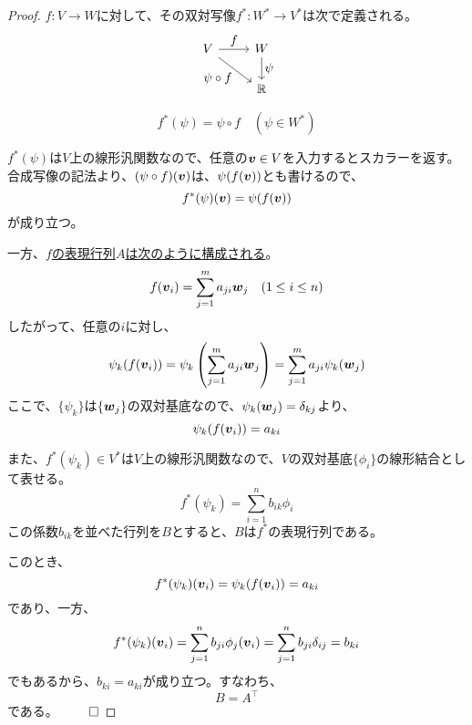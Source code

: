 \documentclass[../../../topic_linear-algebra]{subfiles}
\begin{document}
\begin{proof}
  $f\colon V \to W$に対して、その双対写像$f^* \colon W^* \to V^*$は次で定義される。
    \begin{equation*}
  \begin{tikzcd}[every label/.append style = {font = \normalsize}]
    V \arrow[r,"f"]\arrow[rd, "\psi \circ f"'] & W \arrow[d,"\psi"]\\
    & \mathbb{R}
  \end{tikzcd}
\end{equation*}
  
  \begin{equation*}
    f^*(\psi) = \psi \circ f \quad (\psi \in W^*)
  \end{equation*}
  
  $f^*(\psi)$は$V$上の線形汎関数なので、任意の$\vb*{v} \in V$を入力するとスカラーを返す。
  合成写像の記法より、$(\psi \circ f)(\vb*{v})$は、$\psi(f(\vb*{v}))$とも書けるので、
  \begin{equation*}
    f^*(\psi)(\vb*{v}) = \psi(f(\vb*{v}))
  \end{equation*}
  が成り立つ。
  
  \br

  一方、\hyperref[sec:construction-of-matrix-rep]{$f$の表現行列$A$は次のように構成される}。
  \begin{equation*}
    f(\vb*{v}_i) = \sum_{j=1}^m a_{ji} \vb*{w}_j \quad (1 \leq i \leq n)
  \end{equation*}
  したがって、任意の$i$に対し、
  \begin{equation*}
    \psi_k(f(\vb*{v}_i)) = \psi_k\left(\sum_{j=1}^m a_{ji} \vb*{w}_j\right) = \sum_{j=1}^m a_{ji} \psi_k(\vb*{w}_j)
  \end{equation*}
  ここで、$\{ \psi_k \}$は$\{ \vb*{w}_j \}$の双対基底なので、$\psi_k(\vb*{w}_j) = \delta_{kj}$より、
  \begin{equation*}
    \psi_k(f(\vb*{v}_i)) = a_{ki}
  \end{equation*}
  
  \br

  また、$f^*(\psi_k) \in V^*$は$V$上の線形汎関数なので、$V$の双対基底$\{ \phi_i \}$の線形結合として表せる。
  \begin{equation*}
    f^*(\psi_k) = \sum_{i=1}^n b_{ik} \phi_i
  \end{equation*}
  この係数$b_{ik}$を並べた行列を$B$とすると、$B$は$f^*$の表現行列である。
  
  \br
  
  このとき、
  \begin{equation*}
    f^*(\psi_k)(\vb*{v}_i) = \psi_k(f(\vb*{v}_i)) = a_{ki}
  \end{equation*}
  であり、一方、
  \begin{equation*}
    f^*(\psi_k)(\vb*{v}_i) = \sum_{j=1}^n b_{ji} \phi_j(\vb*{v}_i) = \sum_{j=1}^n b_{ji} \delta_{ij} = b_{ki}
  \end{equation*}
  でもあるから、$b_{ki} = a_{ki}$が成り立つ。すなわち、
  \begin{equation*}
    B = A^\top
  \end{equation*}
  である。 $\qed$
\end{proof}
\end{document}
